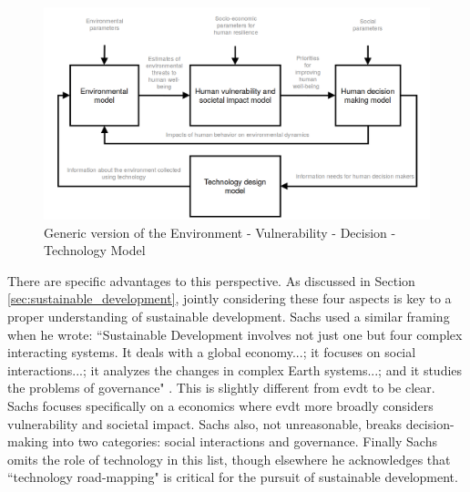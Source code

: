 \begin{figure}[!htb]
    \centering
    \includegraphics[scale=0.3]{Figures/chap3/modelflow.png}
    \caption[Generic version of EVDT Model] {Generic version of the Environment - Vulnerability - Decision - Technology Model}
    \label{fig:model}
\end{figure}

There are specific advantages to this perspective. As discussed in Section \ref{sec:sustainable_development}, jointly considering these four aspects is key to a proper understanding of sustainable development. Sachs used a similar framing when he wrote: ``Sustainable Development involves not just one but four complex interacting systems. It deals with a global economy...; it focuses on social interactions...; it analyzes the changes in complex Earth systems...; and it studies the problems of governance" \cite{sachsAgeSustainableDevelopment2015}. This is slightly different from \ac{evdt} to be clear. Sachs focuses specifically on a economics where \ac{evdt} more broadly considers vulnerability and societal impact. Sachs also, not unreasonable, breaks decision-making into two categories: social interactions and governance. Finally Sachs omits the role of technology in this list, though elsewhere he acknowledges that ``technology road-mapping" is critical for the pursuit of sustainable development.

